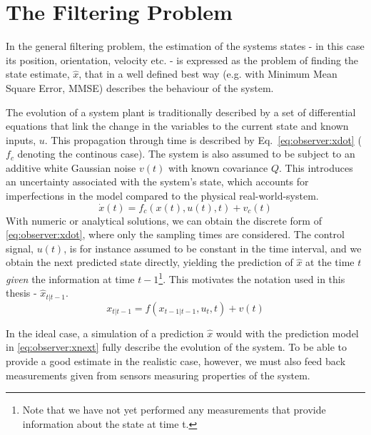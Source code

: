 \section{The Filtering Problem}
\label{sec:observer:filtering}
    In the general filtering problem, the estimation of the systems states - in this case
    its position, orientation, velocity etc. - is
    expressed as the problem of finding the state estimate,
    $\hat{x}$, that in a well defined best way (e.g. with Minimum Mean Square Error, MMSE)
    describes the behaviour of the system.

    The evolution of a system plant is traditionally described by a set of differential equations
    that link the change in the variables to the current state and known inputs, $u$.
    This propagation through time is described by Eq.~\eqref{eq:observer:xdot} ($f_{c}$ denoting the continous case).
    The system is also assumed to be subject to an additive white Gaussian noise $v(t)$ with
    known covariance $Q$.
    This introduces an uncertainty associated with the system's state, which accounts
    for imperfections in the model compared to the physical real-world-system.
    \begin{equation}
        \label{eq:observer:xdot}
        \dot{x}(t) = f_{c}(x(t),u(t),t) + v_{c}(t)
    \end{equation}
    With numeric or analytical solutions, we can obtain the discrete form of
    \eqref{eq:observer:xdot}, where only the sampling times are considered.
    The control signal, $u(t)$, is for instance assumed to be constant in the time interval,
    and we obtain the next predicted state directly, yielding the prediction of $\hat{x}$
    at the time $t$ \textit{given} the information at time
    $t-1$\footnote{Note that we have not yet performed any measurements that provide information about the state at time t.}.
    This motivates the notation used in this thesis - $\hat{x}_{t|t-1}$.
    \begin{equation}
        \label{eq:observer:xnext}
        x_{t|t-1} = f(x_{t-1|t-1},u_{t},t) + v(t)
    \end{equation}

    In the ideal case, a simulation of a prediction $\hat{x}$ would
    with the prediction model in \eqref{eq:observer:xnext} fully describe
    the evolution of the system.
    To be able to provide a good estimate in the realistic case, however,
    we must also feed back measurements given from sensors measuring
    properties of the system.

